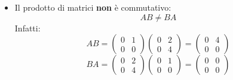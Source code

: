 \documentclass[a4paper]{article}
\theoremstyle{break}
\theoremstyle{break}
\theoremstyle{break}
\theoremstyle{break}
\begin{document}
\begin{itemize}
  \item Il prodotto di matrici \textbf{non} è commutativo:
    \[
      AB \neq BA
    \] 
    Infatti:
    \[
      AB = \begin{pmatrix} 
        0 & 1\\
        0 & 0
      \end{pmatrix}
      \begin{pmatrix} 
        0 & 2\\
        0 & 4
      \end{pmatrix} 
      =
      \begin{pmatrix} 
        0 & 4\\
        0 & 0
      \end{pmatrix} 
    \] 
    \[
      BA = \begin{pmatrix} 
        0 & 2\\
        0 & 4
      \end{pmatrix} 
      \begin{pmatrix} 
        0 & 1\\
        0 & 0
      \end{pmatrix} 
      =
      \begin{pmatrix} 
        0 & 0\\
        0 & 0
      \end{pmatrix} 
    \] 
\end{itemize}
\end{document}
